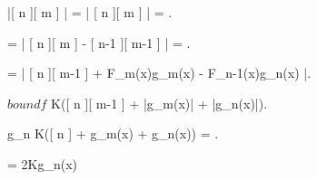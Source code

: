 {{{{			|[ n ][ m ] | = | [ n ][ m ] | = .

			= | [ n ][ m ] - [ n-1 ][ m-1 ] | = .

			= | [ n ][ m-1 ] + F_m(x)g_m(x) - F_{n-1}(x)g_n(x) |.

			$bound f $ \imp \leq K([ n ][ m-1 ]  + |g_m(x)| + |g_n(x)|).

			g_n  \imp \leq K([ n ] + g_m(x) + g_n(x)) = .

			= 2Kg_n(x) 


		}
	}}
}